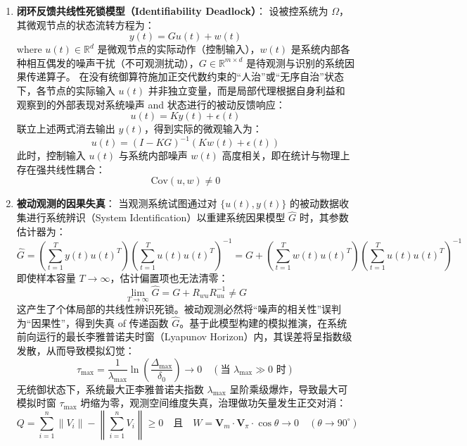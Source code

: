 \documentclass[11pt,a4paper]{article}
\begin{document}
\begin{enumerate}
    \item \textbf{闭环反馈共线性死锁模型（Identifiability Deadlock）}：
    设被控系统为 $\Omega$，其微观节点的状态流转方程为：
    \begin{equation}
        y(t) = G u(t) + w(t)
    \end{equation}
    where $u(t) \in \mathbb{R}^d$ 是微观节点的实际动作（控制输入），$w(t)$ 是系统内部各种相互偶发的噪声干扰（不可观测扰动），$G \in \mathbb{R}^{m \times d}$ 是待观测与识别的系统因果传递算子。
    在没有统御算符施加正交代数约束的“人治”或“无序自治”状态下，各节点的实际输入 $u(t)$ 并非独立变量，而是局部代理根据自身利益和观察到的外部表现对系统噪声 and 状态进行的被动反馈响应：
    \begin{equation}
        u(t) = K y(t) + \epsilon(t)
    \end{equation}
    联立上述两式消去输出 $y(t)$，得到实际的微观输入为：
    \begin{equation}
        u(t) = (I - KG)^{-1} (Kw(t) + \epsilon(t))
    \end{equation}
    此时，控制输入 $u(t)$ 与系统内部噪声 $w(t)$ 高度相关，即在统计与物理上存在强共线性耦合：
    \begin{equation}
        \text{Cov}(u, w) \neq 0
    \end{equation}
    
    \item \textbf{被动观测的因果失真}：
    当观测系统试图通过对 $\{u(t), y(t)\}$ 的被动数据收集进行系统辨识（System Identification）以重建系统因果模型 $\hat{G}$ 时，其参数估计器为：
    \begin{equation}
        \hat{G} = \left(\sum_{t=1}^T y(t) u(t)^T \right) \left(\sum_{t=1}^T u(t) u(t)^T \right)^{-1} = G + \left(\sum_{t=1}^T w(t) u(t)^T \right) \left(\sum_{t=1}^T u(t) u(t)^T \right)^{-1}
    \end{equation}
    即使样本容量 $T \to \infty$，估计偏置项也无法清零：
    \begin{equation}
        \lim_{T \to \infty} \hat{G} = G + R_{wu} R_{uu}^{-1} \neq G
    \end{equation}
    这产生了个体局部的共线性辨识死锁。被动观测必然将“噪声的相关性”误判为“因果性”，得到失真 of 传递函数 $\hat{G}$。基于此模型构建的模拟推演，在系统前向运行的最长李雅普诺夫时窗（Lyapunov Horizon）内，其误差将呈指数级发散，从而导致模拟幻觉：
    \begin{equation}\label{lyapunov-horizon}
        \tau_{\text{max}} = \frac{1}{\lambda_{\text{max}}} \ln \left( \frac{\Delta_{\text{max}}}{\delta_0} \right) \to 0 \quad (\text{当 } \lambda_{\text{max}} \gg 0 \text{ 时})
    \end{equation}
    无统御状态下，系统最大正李雅普诺夫指数 $\lambda_{\text{max}}$ 呈阶乘级爆炸，导致最大可模拟时窗 $\tau_{\text{max}}$ 坍缩为零，观测空间维度失真，治理做功矢量发生正交对消：
    \begin{equation}
        Q = \sum_{i=1}^{n} \|V_i\| - \left\| \sum_{i=1}^{n} V_i \right\| \ge 0 \quad \text{且} \quad W = \mathbf{V}_m \cdot \mathbf{V}_{\pi} \cdot \cos\theta \to 0 \quad (\theta \to 90^\circ)
    \end{equation}


\end{enumerate}
\end{document}
